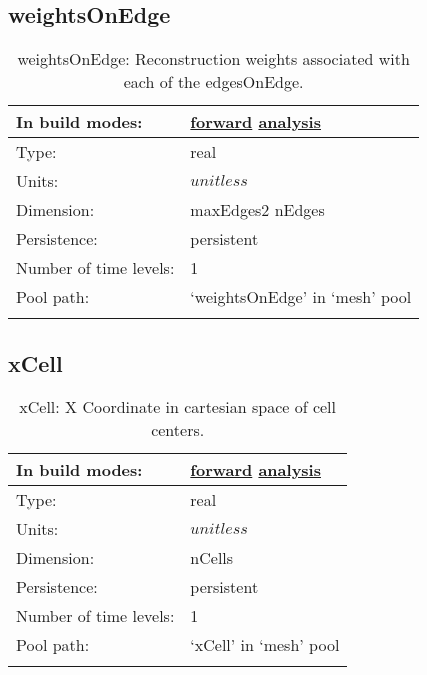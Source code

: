 \subsection[weightsOnEdge]{weightsOnEdge}
\label{subsec:var_sec_mesh_weightsOnEdge}
\begin{center}
\begin{longtable}{| p{2.0in} | p{4.0in} |}
        \hline 
        In build modes: & \hyperref[subsec:forward_var_tab_mesh]{forward} \hyperref[subsec:analysis_var_tab_mesh]{analysis} \\
        \hline 
        Type: & real \\
        \hline 
        Units: & $unitless$ \\
        \hline 
        Dimension: & maxEdges2 nEdges \\
        \hline 
        Persistence: & persistent \\
        \hline 
        Number of time levels: & 1 \\
        \hline 
            Pool path: & `weightsOnEdge' in `mesh' pool \\
		 \hline 
    \caption{weightsOnEdge: Reconstruction weights associated with each of the edgesOnEdge.}
\end{longtable}
\end{center}
\subsection[xCell]{xCell}
\label{subsec:var_sec_mesh_xCell}
\begin{center}
\begin{longtable}{| p{2.0in} | p{4.0in} |}
        \hline 
        In build modes: & \hyperref[subsec:forward_var_tab_mesh]{forward} \hyperref[subsec:analysis_var_tab_mesh]{analysis} \\
        \hline 
        Type: & real \\
        \hline 
        Units: & $unitless$ \\
        \hline 
        Dimension: & nCells \\
        \hline 
        Persistence: & persistent \\
        \hline 
        Number of time levels: & 1 \\
        \hline 
            Pool path: & `xCell' in `mesh' pool \\
		 \hline 
    \caption{xCell: X Coordinate in cartesian space of cell centers.}
\end{longtable}
\end{center}
